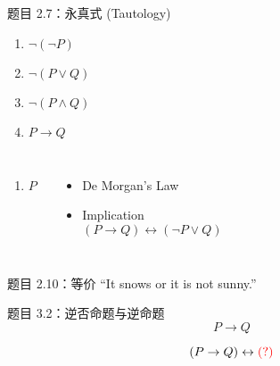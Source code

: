 \begin{frame}{}
  \begin{exampleblock}{题目 2.7：永真式 (Tautology)}
    \begin{enumerate}
      \item $\lnot(\lnot P)$
      \item $\lnot(P \lor Q)$
      \item $\lnot(P \land Q)$
      \item $P \to Q$
    \end{enumerate}
  \end{exampleblock}

  \vspace{0.30cm}
  \begin{columns}
      \begin{enumerate}
	\item $P$
      \end{enumerate}
    \pause
      \begin{itemize}
	\item De Morgan's Law
	\item Implication
	  \[
	    (P \to Q) \leftrightarrow (\lnot P \lor Q)
	  \]
      \end{itemize}
  \end{columns}

  \pause
  \vspace{0.30cm}
  \begin{exampleblock}{题目 2.10：等价}
    ``It snows or it is not sunny.''
  \end{exampleblock}
\end{frame}

\begin{frame}{}
  \begin{exampleblock}{题目 3.2：逆否命题与逆命题}
    \[
      P \to Q
    \]
  \end{exampleblock}

  \[
    (P \to Q) \leftrightarrow \textcolor{red}{(?)}
  \]
\end{frame}


